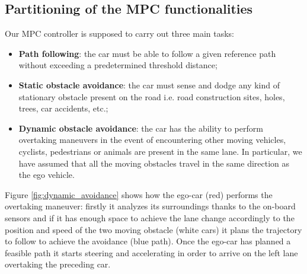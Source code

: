 \subsection{Partitioning of the MPC functionalities}
Our MPC controller is supposed to carry out three main tasks: 
\begin{itemize}
    \item \textbf{Path following}: the car must be able to follow a given reference path without exceeding a predetermined threshold distance;
    \item \textbf{Static obstacle avoidance}: the car must sense and dodge any kind of stationary obstacle present on the road i.e. road construction sites, holes, trees,  car accidents, etc.;
    \item \textbf{Dynamic obstacle avoidance}: the car has the ability to perform overtaking maneuvers in the event of encountering other moving vehicles, cyclists, pedestrians or animals are present in the same lane. In particular, we have assumed that all the moving obstacles travel in the same direction as the ego vehicle.
    
    
    
\end{itemize}
Figure \ref{fig:dynamic_avoidance} shows how the ego-car (red) performs the overtaking maneuver: firstly it analyzes its surroundings thanks to the on-board sensors and if it has enough space to achieve the lane change accordingly to the position and speed of the two moving obstacle (white cars) it plans the trajectory to follow to achieve the avoidance (blue path). Once the ego-car has planned a feasible path it starts steering and accelerating in order to arrive on the left lane overtaking the preceding car.

